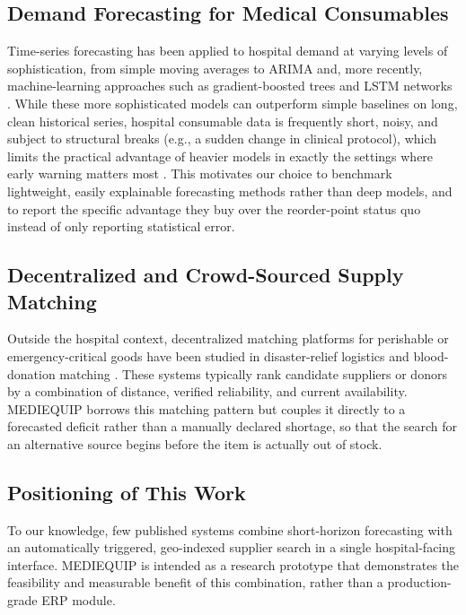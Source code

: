 \documentclass[conference]{IEEEtran}
\begin{document}
\subsection{Demand Forecasting for Medical Consumables}

Time-series forecasting has been applied to hospital demand at varying levels of sophistication, from simple moving averages to ARIMA and, more recently, machine-learning approaches such as gradient-boosted trees and LSTM networks \cite{b6,b7}. While these more sophisticated models can outperform simple baselines on long, clean historical series, hospital consumable data is frequently short, noisy, and subject to structural breaks (e.g., a sudden change in clinical protocol), which limits the practical advantage of heavier models in exactly the settings where early warning matters most \cite{b6}. This motivates our choice to benchmark lightweight, easily explainable forecasting methods rather than deep models, and to report the specific advantage they buy over the reorder-point status quo instead of only reporting statistical error.

\subsection{Decentralized and Crowd-Sourced Supply Matching}

Outside the hospital context, decentralized matching platforms for perishable or emergency-critical goods have been studied in disaster-relief logistics \cite{b3} and blood-donation matching \cite{b8}. These systems typically rank candidate suppliers or donors by a combination of distance, verified reliability, and current availability. MEDIEQUIP borrows this matching pattern but couples it directly to a forecasted deficit rather than a manually declared shortage, so that the search for an alternative source begins before the item is actually out of stock.

\subsection{Positioning of This Work}

To our knowledge, few published systems combine short-horizon forecasting with an automatically triggered, geo-indexed supplier search in a single hospital-facing interface. MEDIEQUIP is intended as a research prototype that demonstrates the feasibility and measurable benefit of this combination, rather than a production-grade ERP module.
\end{document}
